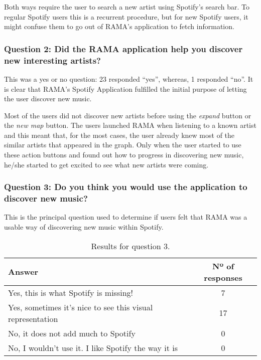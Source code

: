       Both ways require the user to search a new artist using Spotify's search bar.
      To regular Spotify users this is a recurrent procedure, but for new Spotify users, it might confuse them to go out of RAMA's application to fetch information.
    
    \subsubsection{Question 2: Did the RAMA application help you discover new interesting artists?}
    \label{ssub:question_2}

      This was a yes or no question: 23 responded  ``yes'', whereas, 1 responded ``no''.
      It is clear that RAMA's Spotify Application fulfilled the initial purpose of letting the user discover new music.

      Most of the users did not discover new artists before using the \emph{expand} button or the \emph{new map} button.
      The users launched RAMA when listening to a known artist and this meant that, for the most cases, the user already knew most of the similar artists that appeared in the graph.
      Only when the user started to use these action buttons and found out how to progress in discovering new music, he/she started to get excited to see what new artists were coming.

    \subsubsection{Question 3: Do you think you would use the application to discover new music?}
    \label{ssub:question_3}

      This is the principal question used to determine if users felt that RAMA was a usable way of discovering new music within Spotify.

      \begin{table}[H]
         \begin{center}
           \begin{tabular}{l|c}
       
           \hline
           \textbf{Answer} & \textbf{Nº of responses} \\
           \hline

           \hline
            Yes, this is what Spotify is missing! & 7 \\
            Yes, sometimes it's nice to see this visual representation & 17 \\
            No, it does not add much to Spotify & 0 \\
            No, I wouldn't use it. I like Spotify the way it is & 0 \\
           \hline
           \end{tabular}
         \end{center}
         \caption{Results for question 3.}
         \label{tab:question3}
       \end{table}


